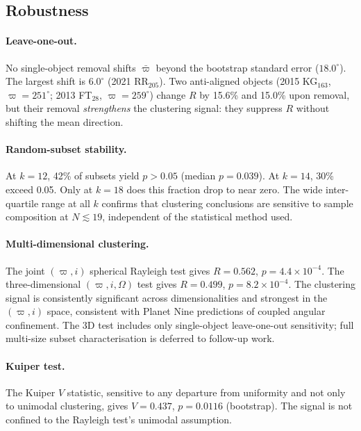 \documentclass[usenatbib]{mnras}
\begin{document}
\subsection{Robustness}

\paragraph{Leave-one-out.}
No single-object removal shifts $\bar{\varpi}$ beyond the bootstrap standard error ($18.0^\circ$). The largest shift is $6.0^\circ$ (2021 RR$_{205}$). Two anti-aligned objects (2015 KG$_{163}$, $\varpi=251^\circ$; 2013 FT$_{28}$, $\varpi=259^\circ$) change $R$ by 15.6\% and 15.0\% upon removal, but their removal \textit{strengthens} the clustering signal: they suppress $R$ without shifting the mean direction.

\paragraph{Random-subset stability.}
At $k=12$, 42\% of subsets yield $p>0.05$ (median $p=0.039$). At $k=14$, 30\% exceed 0.05. Only at $k=18$ does this fraction drop to near zero. The wide inter-quartile range at all $k$ confirms that clustering conclusions are sensitive to sample composition at $N\lesssim19$, independent of the statistical method used.

\paragraph{Multi-dimensional clustering.}
The joint $(\varpi, i)$ spherical Rayleigh test gives $R=0.562$, $p=4.4\times10^{-4}$. The three-dimensional $(\varpi, i, \Omega)$ test gives $R=0.499$, $p=8.2\times10^{-4}$. The clustering signal is consistently significant across dimensionalities and strongest in the $(\varpi, i)$ space, consistent with Planet Nine predictions of coupled angular confinement. The 3D test includes only single-object leave-one-out sensitivity; full multi-size subset characterisation is deferred to follow-up work.

\paragraph{Kuiper test.}
The Kuiper $V$ statistic, sensitive to any departure from uniformity and not only to unimodal clustering, gives $V=0.437$, $p=0.0116$ (bootstrap). The signal is not confined to the Rayleigh test's unimodal assumption.
\end{document}
